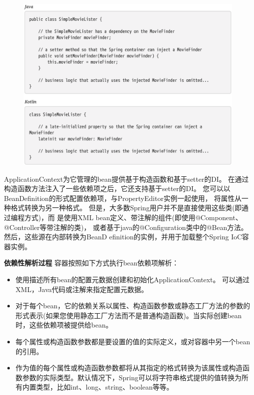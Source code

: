 \begin{figure}[ht]
    \centering
    \includegraphics[width=1\linewidth]{./Figure/IMG_code_31.png}
\end{figure}

ApplicationContext为它管理的bean提供基于构造函数和基于setter的DI。
在通过构造函数方法注入了一些依赖项之后，它还支持基于setter的DI。
您可以以BeanDefinition的形式配置依赖项，与PropertyEditor实例一起使用，
将属性从一种格式转换为另一种格式。
但是，大多数Spring用户并不是直接使用这些类(即通过编程方式)，而
是使用XML bean定义、带注解的组件(即使用@Component、@Controller等带注解的类)，
或者基于java的@Configuration类中的@Bean方法。然后，这些源在内部转换为BeanD
efinition的实例，并用于加载整个Spring IoC容器实例。

\textbf{依赖性解析过程} 容器按照如下方式执行bean依赖项解析：

\begin{itemize}
    \item 使用描述所有bean的配置元数据创建和初始化ApplicationContext。 可以通过XML，Java代码或注解来指定配置元数据。
    \item 对于每个bean，它的依赖关系以属性、构造函数参数或静态工厂方法的参数的形式表示(如果您使用静态工厂方法而不是普通构造函数)。当实际创建bean时，这些依赖项被提供给bean。
    \item 每个属性或构造函数参数都是要设置的值的实际定义，或对容器中另一个bean的引用。
    \item 作为值的每个属性或构造函数参数都将从其指定的格式转换为该属性或构造函数参数的实际类型。默认情况下，Spring可以将字符串格式提供的值转换为所有内置类型，比如int、long、string、boolean等等。
\end{itemize}

